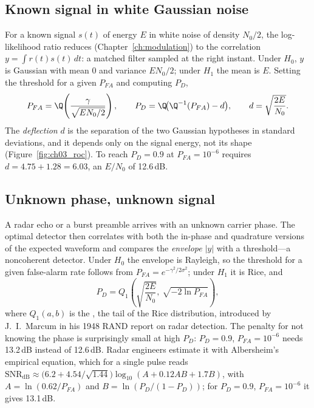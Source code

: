 \subsection{Known signal in white Gaussian noise}

For a known signal $s(t)$ of energy $E$ in white noise of density $N_0/2$, the log-likelihood ratio reduces
(Chapter~\ref{ch:modulation}) to the correlation $y=\int r(t)s(t)\,dt$: a matched filter sampled at the
right instant. Under $H_0$, $y$ is Gaussian with mean 0 and variance $EN_0/2$; under $H_1$ the mean is $E$.
Setting the threshold for a given $P_{FA}$ and computing $P_D$,
\begin{equation}
P_{FA}=\Q\!\left(\frac{\gamma}{\sqrt{EN_0/2}}\right),\qquad
P_D=\Q\!\big(\Q^{-1}(P_{FA})-d\big),\qquad d=\sqrt{\frac{2E}{N_0}} .
\label{eq:ch03:pd}
\end{equation}
The \emph{deflection} $d$ is the separation of the two Gaussian hypotheses in standard deviations, and it
depends only on the signal energy, not its shape (Figure~\ref{fig:ch03_roc}). To reach $P_D=0.9$ at
$P_{FA}=10^{-6}$ requires $d=4.75+1.28=6.03$, an $E/N_0$ of 12.6\,dB.


\subsection{Unknown phase, unknown signal}

A radar echo or a burst preamble arrives with an unknown carrier phase. The optimal detector then
correlates with both the in-phase and quadrature versions of the expected waveform and compares the
\emph{envelope} $|y|$ with a threshold---a noncoherent detector. Under $H_0$ the envelope is Rayleigh, so
the threshold for a given false-alarm rate follows from $P_{FA}=e^{-\gamma^2/2\sigma^2}$; under $H_1$ it is
Rice, and
\begin{equation}
P_D=Q_1\!\left(\sqrt{\frac{2E}{N_0}},\ \sqrt{-2\ln P_{FA}}\right),
\label{eq:ch03:marcum}
\end{equation}
where $Q_1(a,b)$ is the , the tail of the Rice distribution, introduced by
J.~I.~Marcum in his 1948 RAND report on radar detection. The penalty for not knowing the phase is
surprisingly small at high $P_D$: $P_D=0.9$, $P_{FA}=10^{-6}$ needs 13.2\,dB instead of 12.6\,dB. Radar
engineers estimate it with Albersheim's empirical equation, which for a single pulse reads
$\mathrm{SNR}_{\mathrm{dB}}\approx\big(6.2+4.54/\sqrt{1.44}\big)\log_{10}(A+0.12AB+1.7B)$, with
$A=\ln(0.62/P_{FA})$ and $B=\ln(P_D/(1-P_D))$; for $P_D=0.9$, $P_{FA}=10^{-6}$ it gives 13.1\,dB.


